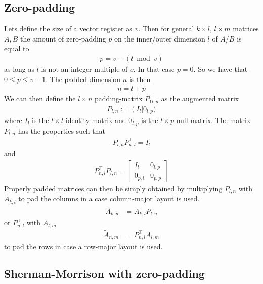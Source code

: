 \documentclass[11pt]{article}
\numberwithin{figure}{section}
\numberwithin{table}{section}
\begin{document}
\newpage
\begin{appendices}
\section{Zero-padding}
  Lets define the size of a vector register as $v$. Then for general $k\times l$, $l\times m $ matrices $A,B$ the amount of zero-padding $p$ on the inner/outer dimension $l$ of $A$/$B$ is equal to
  \begin{align}
  p = v-(l\bmod{v})	
  \end{align}
  as long as $l$ is not an integer multiple of $v$. In that case $p=0$. So we have that $0 \leq p \leq v-1$. The padded dimension $n$ is then
  \begin{align}
  n = l + p
  \end{align}
  We can then define the $l\times n$ padding-matrix $P_{1l,n}$ as the augmented matrix
  \begin{align}
  P_{l,n} := \left(I_l\right|0_{l,p})
  \end{align}
  where $I_l$ is the $l\times l$ identity-matrix and $0_{l,p}$ is the $l\times p$ null-matrix.
  The matrix $P_{l,n}$ has the properties such that
  \begin{align}
  P_{l,n}P^\top _{n,l}=I_l
  \end{align}
  and
  \begin{align}
  P^\top _{n,l}P_{l,n}=
  \begin{bmatrix}
  I_l & 0_{l,p} \\
  0_{p,l} & 0_{p,p}
  \end{bmatrix}
  \end{align}
  Properly padded matrices can then be simply obtained by multiplying $P_{l,n}$ with $A_{k,l}$ to pad the columns in a case column-major layout is used.
  \begin{align}
  \widetilde{A}_{k,n} &= A_{k,l}P_{l,n}
  \end{align}
  or $P^\top_{n,l}$ with $A_{l,m}$
  \begin{align}
  \widetilde{A}_{n,m} &= P^\top_{n,l}A_{l,m}
  \end{align}
  to pad the rows in case a row-major layout is used.

  \subsection{Sherman-Morrison with zero-padding}


\end{appendices}
\end{document}
